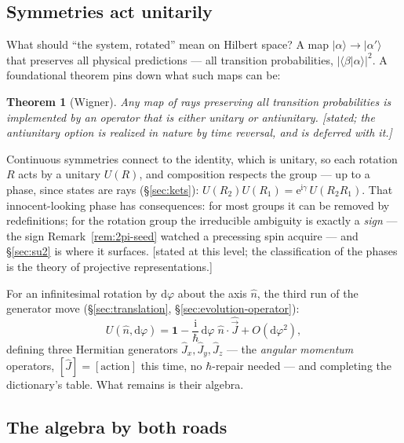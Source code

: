 \documentclass[11pt]{article}
\theoremstyle{plain}
\newtheorem{theorem}{Theorem}[section]
\theoremstyle{definition}
\theoremstyle{remark}
\newcommand{\dd}{\mathrm{d}}
\newcommand{\ee}{\mathrm{e}}
\newcommand{\ii}{\mathrm{i}}
\newcommand{\op}[1]{\hat{#1}}
\newcommand{\idop}{\mathbf{1}}  %
\newcommand{\ket}[1]{\lvert #1 \rangle}
\newcommand{\braket}[2]{\langle #1 | #2 \rangle}
\begin{document}
\subsection{Symmetries act unitarily}
\label{sec:wigner-theorem}

What should ``the system, rotated'' mean on Hilbert space? A map
$\ket\alpha \to \ket{\alpha'}$ that preserves all physical
predictions --- all transition probabilities,
$|\braket\beta\alpha|^2$. A foundational theorem pins down what
such maps can be:

\begin{theorem}[Wigner]\label{thm:wigner}
Any map of rays preserving all transition probabilities is
implemented by an operator that is either unitary or antiunitary.
[stated; the antiunitary option is realized in nature by time
reversal, and is deferred with it.]
\end{theorem}

\noindent
Continuous symmetries connect to the identity, which is unitary, so
each rotation $R$ acts by a unitary $U(R)$, and composition respects
the group --- up to a phase, since states are rays
(\S\ref{sec:kets}): $U(R_2)U(R_1) = \ee^{\ii\gamma}\,
U(R_2 R_1)$. That innocent-looking phase has consequences: for most
groups it can be removed by redefinitions; for the rotation group
the irreducible ambiguity is exactly a \emph{sign} --- the sign
Remark~\ref{rem:2pi-seed} watched a precessing spin acquire --- and
\S\ref{sec:su2} is where it surfaces. [stated at this level;
the classification of the phases is the theory of projective
representations.]

For an infinitesimal rotation by $\dd\varphi$ about the axis
$\hat n$, the third run of the generator move
(\S\ref{sec:translation}, \S\ref{sec:evolution-operator}):
\begin{equation}
  U(\hat n, \dd\varphi)
  = \idop
  - \frac{\ii}{\hbar}\,\dd\varphi\;
    \hat n\cdot\op{\vec J}
  + O(\dd\varphi^2),
  \label{eq:J-generator}
\end{equation}
defining three Hermitian generators $\op J_x, \op J_y, \op J_z$ ---
the \emph{angular momentum} operators, $[\op J] = [\text{action}]$
this time, no $\hbar$-repair needed --- and completing the
dictionary's table. What remains is their algebra.

\subsection{The algebra by both roads}
\label{sec:rotation-algebra}
\end{document}
